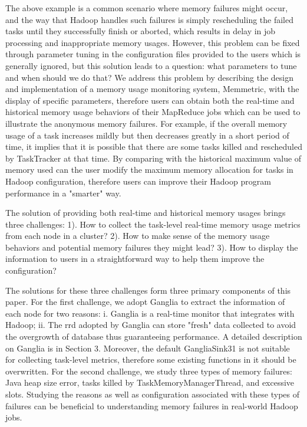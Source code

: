 The above example is a common scenario where memory failures might occur, and the way that Hadoop handles such failures is simply rescheduling the failed tasks until they successfully finish or aborted, which results in delay in job processing and inappropriate memory usages.
However, this problem can be fixed through parameter tuning in the configuration files provided to the users which is generally ignored, but this solution leads to a question: what parameters to tune and when should we do that? 
We address this problem by describing the design and implementation of a memory usage monitoring system, Memmetric, with the display of specific parameters, therefore users can obtain both the real-time and historical memory usage behaviors of their MapReduce jobs which can be used to illustrate the anonymous memory failures.
For example, if the overall memory usage of a task increases mildly but then decreases greatly in a short period of time, it implies that it is possible that there are some tasks killed and rescheduled by TaskTracker at that time.
By comparing with the historical maximum value of memory used can the user modify the maximum memory allocation for tasks in Hadoop configuration, therefore users can improve their Hadoop program performance in a "smarter" way.
\par
The solution of providing both real-time and historical memory usages brings three challenges: 1). How to collect the task-level real-time memory usage metrics from each node in a cluster? 2). How to make sense of the memory usage behaviors and potential memory failures they might lead? 3). How to display the information to users in a straightforward way to help them improve the configuration?
\par
The solutions for these three challenges form three primary components of this paper. For the first challenge, we adopt Ganglia to extract the information of each node for two reasons: i. Ganglia is a real-time monitor that integrates with Hadoop; ii. The rrd adopted by Ganglia can store "fresh" data collected to avoid the overgrowth of database thus guaranteeing performance. A detailed description on Ganglia is in Section 3.
Moreover, the default GangliaSink31 is not suitable for collecting task-level metrics, therefore some existing functions in it should be overwritten.
For the second challenge, we study three types of memory failures: Java heap size error, tasks killed by TaskMemoryManagerThread, and excessive slots.
Studying the reasons as well as configuration associated with these types of failures can be beneficial to understanding memory failures in real-world Hadoop jobs.
